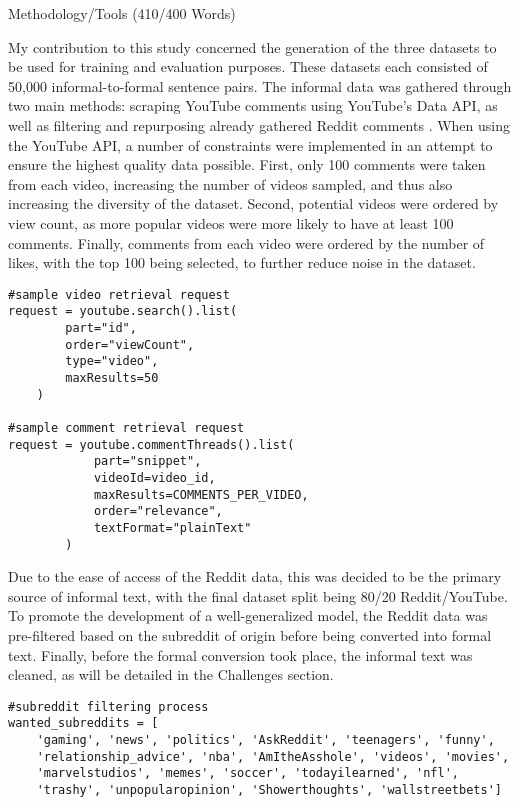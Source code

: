 \documentclass[a4paper,9pt]{scrartcl}
\makeatletter
\renewcommand{\subsection}{\@startsection{subsection}{2}{0mm}
  {0.25\baselineskip} 
  {0.25\baselineskip} 
  {\normalfont\normalsize\bfseries}}
\makeatother
\begin{document}
\subsection{Methodology/Tools (410/400 Words)}

My contribution to this study concerned the generation of the three datasets to be used for
training and evaluation purposes. These datasets each consisted of 50,000 
informal-to-formal sentence pairs. The informal data was gathered through two main methods: scraping 
YouTube comments using YouTube's Data API, as well as filtering and repurposing already gathered Reddit 
comments \cite{zotero-400}. When using the YouTube API, a number of constraints were implemented in an 
attempt to ensure the highest quality data possible. First, only 100 comments were taken from each video,
increasing the number of videos sampled, and thus also increasing the diversity of the dataset. Second, 
potential videos were ordered by view count, as more popular videos were more likely to have at least 100 
comments. Finally, comments from each video were ordered by the number of likes, with the top 100 being 
selected, to further reduce noise in the dataset.


\begin{lstlisting}
#sample video retrieval request
request = youtube.search().list(
        part="id",
        order="viewCount",
        type="video",
        maxResults=50
    )

#sample comment retrieval request
request = youtube.commentThreads().list(
            part="snippet",
            videoId=video_id,
            maxResults=COMMENTS_PER_VIDEO,
            order="relevance",
            textFormat="plainText"
        )
\end{lstlisting}



Due to the ease of access of the Reddit data, this was decided to be the primary source of
informal text, with the final dataset split being 80/20 Reddit/YouTube. To promote the development of a 
well-generalized model, the Reddit data was pre-filtered based on the subreddit of origin before being 
converted into formal text. Finally, before the formal conversion took place, the informal text was cleaned,
as will be detailed in the Challenges section.

\begin{lstlisting}
#subreddit filtering process
wanted_subreddits = [
    'gaming', 'news', 'politics', 'AskReddit', 'teenagers', 'funny',
    'relationship_advice', 'nba', 'AmItheAsshole', 'videos', 'movies',
    'marvelstudios', 'memes', 'soccer', 'todayilearned', 'nfl',
    'trashy', 'unpopularopinion', 'Showerthoughts', 'wallstreetbets']
\end{lstlisting}
\end{document}

